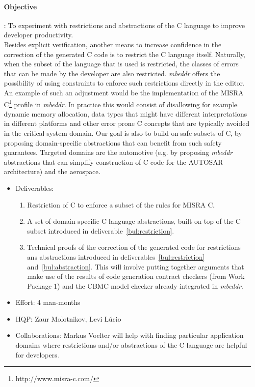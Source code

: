 \paragraph{\textbf{Objective}}: To experiment with restrictions and abstractions
of the C language to improve developer productivity.\vspace{.2cm}\\
Besides explicit verification, another means to increase confidence in the
correction of the generated C code is to restrict the C language itself.
Naturally, when the subset of the language that is used is restricted, the
classes of errors that can be made by the developer are also restricted.
\emph{mbeddr} offers the possibility of using constraints to enforce such
restrictions directly in the editor. An example of such an adjustment would be
the implementation of the MISRA C\footnote{http://www.misra-c.com/} profile in
\emph{mbeddr}.
In practice this would consist of disallowing for example dynamic memory
allocation, data types that might have different interpretations in different
platforms and other error prone C concepts that are typically avoided in the
critical system domain.
Our goal is also to build on safe subsets of C, by proposing domain-specific
abstractions that can benefit from such safety guarantees.
Targeted domains are the automotive (e.g. by proposing \emph{mbeddr} abstractions that can simplify
construction of C code for the AUTOSAR architecture) and the aerospace.

\begin{itemize}
  \item Deliverables:
  \begin{enumerate}
    \item\label{bul:restriction}Restriction of C to enforce a subset of the
    rules for MISRA C.
    \item\label{bul:abstraction} A set of domain-specific C language
    abstractions, built on top of the C subset introduced in
    deliverable~\ref{bul:restriction}.
\item Technical proofs of the correction of the generated code for restrictions
ans abstractions introduced in deliverables~\ref{bul:restriction}
and~\ref{bul:abstraction}.
This will involve putting together arguments that make use of the results of
code generation contract checkers (from Work Package 1) and the CBMC model checker already integrated in \emph{mbeddr}.
  \end{enumerate}
  \item Effort: 4 man-months
  \item HQP: Zaur Molotnikov, Levi L\'ucio
  \item Collaborations: Markus Voelter will help with finding
  particular application domains where restrictions and/or abstractions of the C
  language are helpful for developers.
\end{itemize}